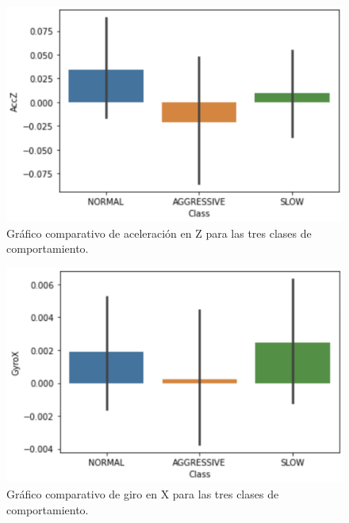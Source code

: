 \documentclass[spanish,12pt,letterpaper]{article}
\begin{document}
    \begin{figure}[htb]
        \centering
        \includegraphics[width=1\columnwidth]{AccZ.png}
        \caption{Gráfico comparativo de aceleración en Z para las tres clases de comportamiento.}
        \label{fig:comand}%
    \end{figure}

    \begin{figure}[htb]
        \centering
        \includegraphics[width=1\columnwidth]{GyroX.png}
        \caption{Gráfico comparativo de giro en X para las tres clases de comportamiento.}
        \label{fig:comand}%
    \end{figure}
\end{document}
